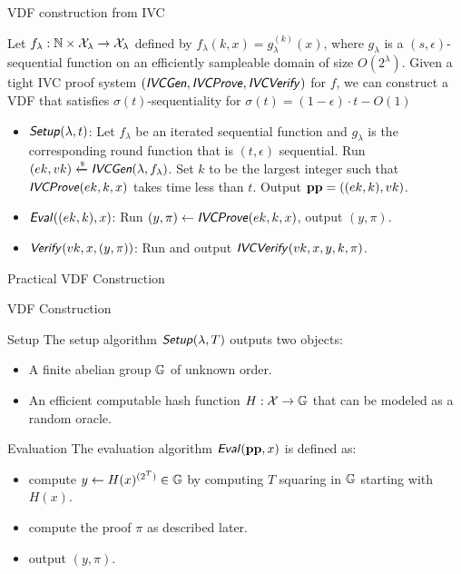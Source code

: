 \documentclass[UTF8]{beamer}
\begin{document}
	\begin{frame}{VDF construction from IVC}
		\begin{block}{}
			Let $f_\lambda:\mathbb{N}\times\mathcal{X}_\lambda\to\mathcal{X}_\lambda$ defined by $f_\lambda(k,x)=g_\lambda^{(k)}(x)$, where $g_\lambda$ is a $(s,\epsilon)$-sequential function on an efficiently sampleable domain of size $O(2^\lambda)$. Given a tight IVC proof system $(\textsf{\textit{IVCGen}},\textsf{\textit{IVCProve}},\textsf{\textit{IVCVerify}})$ for $f$, we can construct a VDF that satisfies $\sigma(t)$-sequentiality for $\sigma(t)=(1-\epsilon)\cdot t-O(1)$
		\end{block}
		\begin{block}{}
			\begin{itemize}
				\item $\textsf{\textit{Setup}}(\lambda,t)$: Let $f_\lambda$ be an iterated sequential function and $g_\lambda$ is the corresponding round function that is $(t,\epsilon)$ sequential. Run $(ek,vk)\xleftarrow{\text{\tiny$\mathsf{\$}$}}\textsf{\textit{IVCGen}}(\lambda,f_\lambda)$. Set $k$ to be the largest integer such that $\textsf{\textit{IVCProve}}(ek,k,x)$ takes time less than $t$. Output $\mathbf{pp}=((ek,k),vk)$.
				\item $\textsf{\textit{Eval}}((ek,k),x)$: Run $(y,\pi)\gets\textsf{\textit{IVCProve}}(ek,k,x)$, output $(y,\pi)$.
				\item $\textsf{\textit{Verify}}(vk,x,(y,\pi))$: Run and output $\textsf{\textit{IVCVerify}}(vk,x,y,k,\pi)$.
			\end{itemize}
		\end{block}
	\end{frame}

	\begin{frame}
		\centering
		\huge Practical VDF Construction
	\end{frame}

	\begin{frame}{VDF Construction}
		\begin{block}{Setup}
			The setup algorithm $\textsf{\textit{Setup}}(\lambda,T)$ outputs two objects:
			\begin{itemize}
				\item A finite abelian group $\mathbb{G}$ of unknown order.
				\item An efficient computable hash function $H:\mathcal{X}\to\mathbb{G}$ that can be modeled as a random oracle.
			\end{itemize}
		\end{block}
		\begin{block}{Evaluation}
			The evaluation algorithm $\textsf{\textit{Eval}}(\mathbf{pp},x)$ is defined as:
			\begin{itemize}
				\item compute $y\gets H(x)^{(2^T)}\in\mathbb{G}$ by computing $T$ squaring in $\mathbb{G}$ starting with $H(x)$.
				\item compute the proof $\pi$ as described later.
				\item output $(y,\pi)$.
			\end{itemize}
		\end{block}
	\end{frame}
\end{document}
